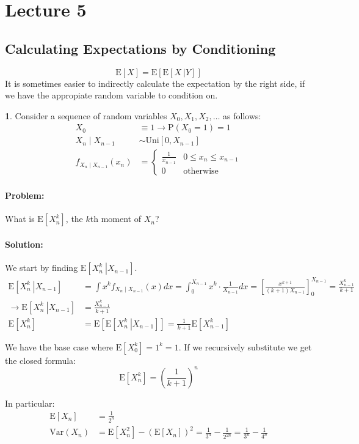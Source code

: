 \documentclass[english,12pt]{article}
\theoremstyle{plain}
\theoremstyle{definition}
\newtheorem*{example}{\protect\examplename}
\theoremstyle{definition} %
\newcommand{\eg}[1]{\begin{example} #1 \end{example} }
\providecommand{\examplename}{Example}
\newcommand{\brac}[1]{\left(#1\right)} %
\newcommand{\ex}[1]{\mbox{E} \left[ #1 \right]}
\newcommand{\var}[1]{\mbox{Var} \left( #1 \right)}
\newcommand{\condex}[2]{\mbox{E} \left[ \left. #1 \ \right\vert \left. #2 \right. \right]}
\begin{document}
\section*{Lecture 5}
\subsection{Calculating Expectations by Conditioning}
\[\ex{X}=\ex{\condex{X}{Y}}\]
It is sometimes easier to indirectly calculate the expectation by the right side, if we have the appropiate random variable to condition on.

\eg{
Consider a sequence of random variables $X_0,X_1,X_2,\ldots$ as follows:
\begin{align*}
X_0&\equiv 1\rightarrow \text{P}(X_0=1)=1\\
X_n\mid X_{n-1}&\sim \text{Uni}\left[0,X_{n-1}\right]\\
f_{X_n\mid X_{n-1}}(x_n)&=\begin{cases}
\frac{1}{x_{n-1}}& 0\le x_n\le x_{n-1}\\
0 & \text{otherwise}
\end{cases}
\end{align*}
\paragraph{Problem:} What is $\ex{X_n^k}$, the $k$th moment of $X_n$?
\paragraph{Solution:}  We start by finding $\condex{X_n^k}{X_{n-1}}$.
\begin{align*}
\condex{X_n^k}{X_{n-1}}
&=\int x^kf_{X_n\mid X_{n-1}}(x)dx
=\int_0^{X_{n-1}}x^k\cdot\frac{1}{X_{n-1}}dx
=\left[\frac{x^{k+1}}{(k+1)X_{n-1}}\right]_0^{X_{n-1}}
=\frac{X_{n-1}^k}{k+1}\\
\rightarrow \condex{X_n^k}{X_{n-1}}&=\frac{X_{n-1}^k}{k+1}\\
\ex{X_n^k}&=\ex{\condex{X_n^k}{X_{n-1}}}
=\frac{1}{k+1}\ex{X_{n-1}^k}
\end{align*}

We have the base case where $\ex{X_0^k}=1^k=1$.  If we recursively substitute we get the closed formula:
\[\ex{X_n^k}=\brac{\frac{1}{k+1}}^n\]

In particular:
\begin{align*}
\ex{X_n}&=\frac{1}{2^n}\\
\var{X_n}&=\ex{X_n^2}-(\ex{X_n})^2
=\frac{1}{3^n}-\frac{1}{2^{2n}}
=\frac{1}{3^n}-\frac{1}{4^n}
\end{align*}
}
\end{document}
